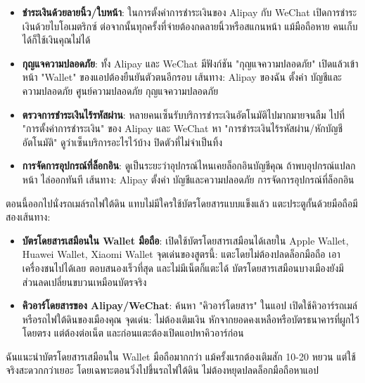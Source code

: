 
\begin{itemize}
  \item \textbf{ชำระเงินด้วยลายนิ้ว/ใบหน้า}: ในการตั้งค่าการชำระเงินของ Alipay กับ WeChat เปิดการชำระเงินด้วยไบโอเมตริกซ์ ต่อจากนั้นทุกครั้งที่จ่ายต้องกดลายนิ้วหรือสแกนหน้า แม้มือถือหาย คนเก็บได้ก็ใช้เงินคุณไม่ได้
  \item \textbf{กุญแจความปลอดภัย}: ทั้ง Alipay และ WeChat มีฟังก์ชัน "กุญแจความปลอดภัย" เปิดแล้วเข้าหน้า "Wallet" ของแอปต้องยืนยันตัวตนอีกรอบ เส้นทาง: Alipay ของฉัน ตั้งค่า บัญชีและความปลอดภัย ศูนย์ความปลอดภัย กุญแจความปลอดภัย
  \item \textbf{ตรวจการชำระเงินไร้รหัสผ่าน}: หลายคนเซ็นรับบริการชำระเงินอัตโนมัติไปมากมายจนลืม ไปที่ "การตั้งค่าการชำระเงิน" ของ Alipay และ WeChat หา "การชำระเงินไร้รหัสผ่าน/หักบัญชีอัตโนมัติ" ดูว่าเซ็นบริการอะไรไว้บ้าง ปิดตัวที่ไม่จำเป็นทิ้ง
  \item \textbf{การจัดการอุปกรณ์ที่ล็อกอิน}: ดูเป็นระยะว่าอุปกรณ์ไหนเคยล็อกอินบัญชีคุณ ถ้าพบอุปกรณ์แปลกหน้า ไล่ออกทันที เส้นทาง: Alipay ตั้งค่า บัญชีและความปลอดภัย การจัดการอุปกรณ์ที่ล็อกอิน
\end{itemize}


ตอนนี้ออกไปนั่งรถเมล์รถไฟใต้ดิน แทบไม่มีใครใช้บัตรโดยสารแบบแข็งแล้ว แตะประตูกั้นด้วยมือถือมีสองเส้นทาง:

\begin{itemize}
  \item \textbf{บัตรโดยสารเสมือนใน Wallet มือถือ}: เปิดใช้บัตรโดยสารเสมือนได้เลยใน Apple Wallet, Huawei Wallet, Xiaomi Wallet จุดเด่นของสูตรนี้: แตะโดยไม่ต้องปลดล็อกมือถือ เอาเครื่องชนไปได้เลย ตอบสนองเร็วที่สุด และไม่มีเน็ตก็แตะได้ บัตรโดยสารเสมือนบางเมืองยังมีส่วนลดเปลี่ยนขบวนเหมือนบัตรจริง
  \item \textbf{คิวอาร์โดยสารของ Alipay/WeChat}: ค้นหา "คิวอาร์โดยสาร" ในแอป เปิดใช้คิวอาร์รถเมล์หรือรถไฟใต้ดินของเมืองคุณ จุดเด่น: ไม่ต้องเติมเงิน หักจากยอดคงเหลือหรือบัตรธนาคารที่ผูกไว้โดยตรง แต่ต้องต่อเน็ต และก่อนแตะต้องเปิดแอปหาคิวอาร์ก่อน
\end{itemize}

ฉันแนะนำบัตรโดยสารเสมือนใน Wallet มือถือมากกว่า แม้ครั้งแรกต้องเติมสัก 10-20 หยวน แต่ใช้จริงสะดวกกว่าเยอะ โดยเฉพาะตอนวิ่งไปขึ้นรถไฟใต้ดิน ไม่ต้องหยุดปลดล็อกมือถือหาแอป


